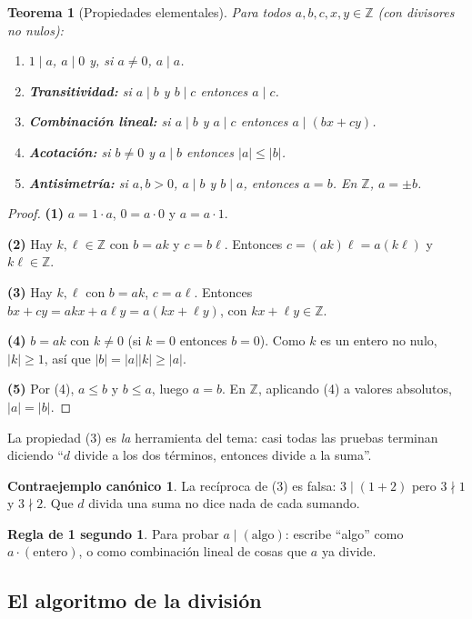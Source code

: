 \documentclass[11pt,a4paper]{article}
\newtheorem{teorema}{Teorema}[section]
\theoremstyle{definition}
\newcommand{\Z}{\mathbb{Z}}
\theoremstyle{notait}
\theoremstyle{nota}
\newtheorem*{contra}{Contraejemplo canónico}
\newtheorem*{regla}{Regla de 1 segundo}
\begin{document}
\begin{teorema}[Propiedades elementales]
Para todos $a,b,c,x,y\in\Z$ (con divisores no nulos):
\begin{enumerate}
  \item $1\mid a$, $a\mid 0$ y, si $a\ne 0$, $a\mid a$.
  \item \textbf{Transitividad:} si $a\mid b$ y $b\mid c$ entonces $a\mid c$.
  \item \textbf{Combinación lineal:} si $a\mid b$ y $a\mid c$ entonces $a\mid (bx+cy)$.
  \item \textbf{Acotación:} si $b\ne 0$ y $a\mid b$ entonces $|a|\le|b|$.
  \item \textbf{Antisimetría:} si $a,b>0$, $a\mid b$ y $b\mid a$, entonces $a=b$. En $\Z$, $a=\pm b$.
\end{enumerate}
\end{teorema}

\begin{proof}
\textbf{(1)} $a=1\cdot a$, $0=a\cdot 0$ y $a=a\cdot 1$.

\textbf{(2)} Hay $k,\ell\in\Z$ con $b=ak$ y $c=b\ell$. Entonces $c=(ak)\ell=a(k\ell)$ y $k\ell\in\Z$.

\textbf{(3)} Hay $k,\ell$ con $b=ak$, $c=a\ell$. Entonces $bx+cy=akx+a\ell y=a(kx+\ell y)$, con $kx+\ell y\in\Z$.

\textbf{(4)} $b=ak$ con $k\ne 0$ (si $k=0$ entonces $b=0$). Como $k$ es un entero no nulo, $|k|\ge 1$, así que $|b|=|a||k|\ge|a|$.

\textbf{(5)} Por (4), $a\le b$ y $b\le a$, luego $a=b$. En $\Z$, aplicando (4) a valores absolutos, $|a|=|b|$.
\end{proof}

La propiedad (3) es \emph{la} herramienta del tema: casi todas las pruebas terminan diciendo ``$d$ divide a los dos términos, entonces divide a la suma''.

\begin{contra}
La recíproca de (3) es falsa: $3\mid (1+2)$ pero $3\nmid 1$ y $3\nmid 2$. Que $d$ divida una suma no dice nada de cada sumando.
\end{contra}

\begin{regla}
Para probar $a\mid(\text{algo})$: escribe ``algo'' como $a\cdot(\text{entero})$, o como combinación lineal de cosas que $a$ ya divide.
\end{regla}

\subsection{El algoritmo de la división}
\end{document}
